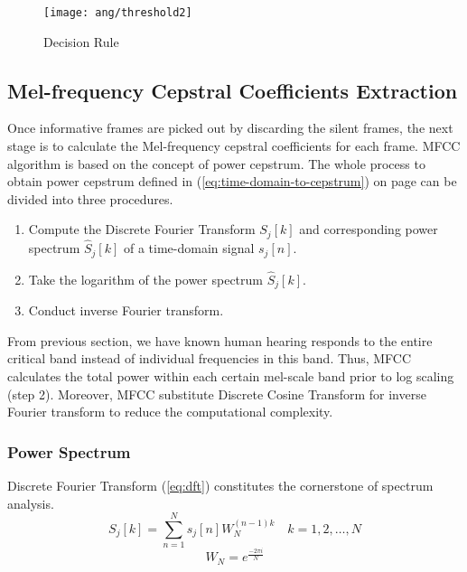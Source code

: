 \begin{figure}[H]
\centering
\texttt{[image: ang/threshold2]}
\caption{Decision Rule}
\label{threshold2}
\end{figure}


\subsection{Mel-frequency Cepstral Coefficients Extraction}
\label{subsection:mfcc}

Once informative frames are picked out by discarding the silent frames, the next stage is to calculate the Mel-frequency cepstral coefficients for each frame. MFCC algorithm is based on the concept of power cepstrum. The whole process to obtain power cepstrum defined in (\ref{eq:time-domain-to-cepstrum}) on page \pageref{eq:time-domain-to-cepstrum} can be divided into three procedures.
\begin{enumerate}
	\item Compute the Discrete Fourier Transform $S_j[k]$ and corresponding power spectrum $\hat{S}_j[k]$ of a time-domain signal $s_j[n]$.
	\item Take the logarithm of the power spectrum $\hat{S}_j[k]$.
	\item Conduct inverse Fourier transform.
\end{enumerate}

From previous section, we have known human hearing responds to the entire critical band instead of individual frequencies in this band. Thus, MFCC calculates the total power within each certain mel-scale band prior to log scaling (step 2). Moreover, MFCC substitute Discrete Cosine Transform for inverse Fourier transform to reduce the computational complexity.

\subsubsection{Power Spectrum}

Discrete Fourier Transform (\ref{eq:dft}) constitutes the cornerstone of spectrum analysis.
\begin{equation}
\label{eq:dft}
S_j[k] = \sum_{n=1}^{N} s_j[n] W_N^{(n-1) k} \quad k = 1, 2, \dots, N
\end{equation}
\begin{equation}
W_N = e^{\frac{- 2\pi i}{N}}
\end{equation}


